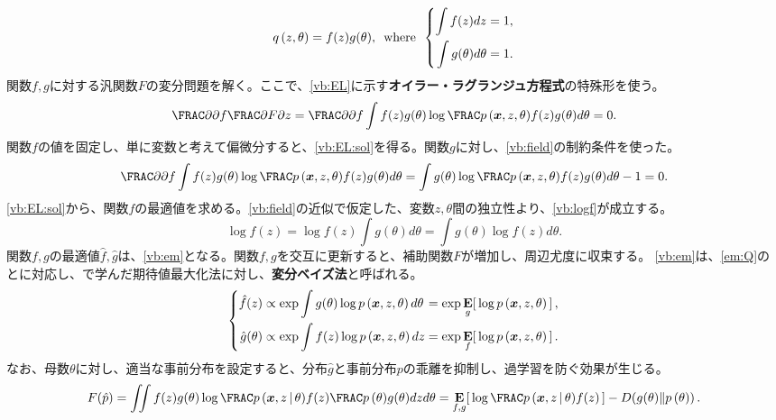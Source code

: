 \documentclass[10pt,a4paper]{book}
\begin{document}
%
\begin{equation}
\label{eq:vb:field}
\qrob{z,\theta} = f(z)g(\theta),
\where
\left\{
\begin{aligned}
\int f(z) dz &= 1,\\
\int g(\theta) d\theta &= 1.
\end{aligned}
\right.
\end{equation}
%
関数$f,g$に対する汎関数$F$の変分問題を解く。ここで、\eqref{vb:EL}に示す\textbf{オイラー・ラグランジュ方程式}の特殊形を使う。
%
\begin{equation}
\label{eq:vb:EL}
\pdiff{}{f} \pdiff{F}{z} =
\pdiff{}{f} \int f(z) g(\theta) \log \frac{\prob{\bm{x},z,\theta}}{f(z)g(\theta)} d\theta = 0.
\end{equation}
%
関数$f$の値を固定し、単に変数と考えて偏微分すると、\eqref{vb:EL:sol}を得る。関数$g$に対し、\eqref{vb:field}の制約条件を使った。
%
\begin{equation}
\label{eq:vb:EL:sol}
\pdiff{}{f} \int f(z) g(\theta) \log \frac{\prob{\bm{x},z,\theta}}{f(z)g(\theta)} d\theta =
\int g(\theta) \log \frac{\prob{\bm{x},z,\theta}}{f(z)g(\theta)} d\theta - 1 = 0.
\end{equation}
%
\eqref{vb:EL:sol}から、関数$f$の最適値を求める。\eqref{vb:field}の近似で仮定した、変数$z,\theta$間の独立性より、\eqref{vb:logf}が成立する。
%
\begin{equation}
\label{eq:vb:logf}
\log f(z) =
\log f(z) \int g(\theta) d\theta =
\int g(\theta) \log f(z) d\theta.
\end{equation}
%
関数$f,g$の最適値$\hat{f},\hat{g}$は、\eqref{vb:em}となる。関数$f,g$を交互に更新すると、補助関数$F$が増加し、周辺尤度に収束する。
\eqref{vb:em}は、\eqref{em:Q}の\Estep{}と\Mstep{}に対応し、で学んだ期待値最大化法に対し、\textbf{変分ベイズ法}と呼ばれる。
%
\begin{equation}
\label{eq:vb:em}
\left\{
\begin{alignedat}{2}
\hat{f}(z) &\propto \exp \int g(\theta) \log \prob{\bm{x},z,\theta} d\theta &&= \exp \E[g]{\log \prob{\bm{x},z,\theta}},\\
\hat{g}(\theta) &\propto \exp \int f(z) \log \prob{\bm{x},z,\theta} dz &&= \exp \E[f]{\log \prob{\bm{x},z,\theta}}.
\end{alignedat}
\right.
\end{equation}
%
なお、母数$\theta$に対し、適当な事前分布を設定すると、分布$\hat{g}$と事前分布$p$の乖離を抑制し、過学習を防ぐ効果が生じる。
%
\begin{equation}
\label{eq:vb:penalty}
F(\hat{p}) =
\iint f(z)g(\theta) \log \frac{\prob{\bm{x},z}[\theta]}{f(z)} \frac{\prob{\theta}}{g(\theta)} dz d\theta =
\E[f,g]{\log \frac{\prob{\bm{x},z}[\theta]}{f(z)}} - \KL{g(\theta)}{\prob{\theta}}.
\end{equation}
\end{document}
